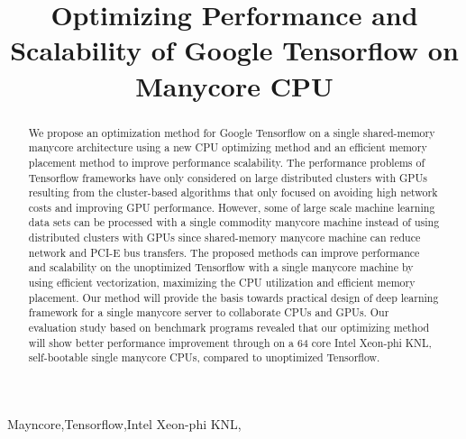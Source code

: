 \documentclass{IOS-Book-Article}
\def\hb{\hbox to 10.7 cm{}}
\begin{document}
\pagestyle{headings}
\def\thepage{}

\begin{frontmatter}              %


\title{Optimizing Performance and Scalability of Google Tensorflow on Manycore
CPU}


\begin{abstract}
We propose an optimization method for Google Tensorflow on a single
shared-memory manycore architecture using a new CPU optimizing method and
an efficient memory placement method to improve performance scalability.
The performance problems of Tensorflow frameworks have only considered on large
distributed clusters with GPUs resulting from the cluster-based
algorithms that only focused on avoiding high network costs and improving GPU
performance. 
However, some of large scale machine learning data sets can be processed with a
single commodity manycore machine instead of using distributed clusters with
GPUs since shared-memory manycore machine can reduce network and PCI-E
bus transfers.
The proposed methods can improve performance and scalability on the unoptimized
Tensorflow with a single manycore machine by using efficient vectorization,
maximizing the CPU utilization and efficient memory placement.
Our method will provide the basis towards practical design of deep learning
framework for a single manycore server to collaborate CPUs and GPUs. 
Our evaluation study based on benchmark programs revealed that our optimizing
method will show better performance improvement through on a 64 core Intel
Xeon-phi KNL, self-bootable single manycore CPUs, compared to unoptimized
Tensorflow.
\end{abstract}

\begin{keyword}
Mayncore\sep Tensorflow\sep Intel Xeon-phi KNL\sep 
\end{keyword}
\end{frontmatter}
\end{document}
